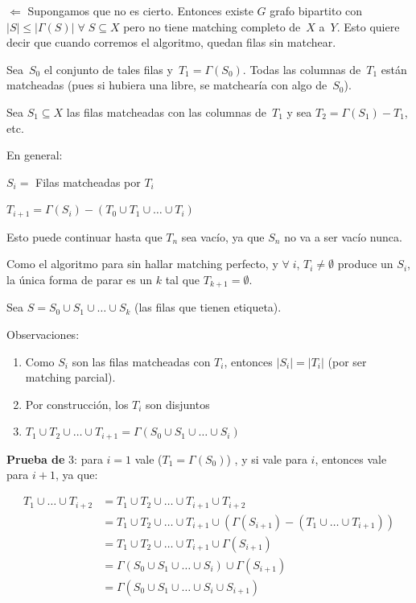 \documentclass[10pt,a4paper]{article}
\begin{document}
$\Leftarrow$ Supongamos que no es cierto. Entonces existe $G$ grafo bipartito con $\lvert S \rvert \leq \lvert \Gamma(S)\rvert\;\forall\;S \subseteq X$ pero no tiene matching completo de $X$ a $Y$. Esto quiere decir que cuando corremos el algoritmo, quedan filas sin matchear.

Sea $S_0$ el conjunto de tales filas y $T_1 = \Gamma(S_0)$. Todas las columnas de $T_1$ están matcheadas (pues si hubiera una libre, se matchearía con algo de $S_0$).

Sea $S_1 \subseteq X$ las filas matcheadas con las columnas de $T_1$ y sea $T_2 = \Gamma(S_1) - T_1$, etc.

En general:

\begin{center}
$S_i = $ Filas matcheadas por $T_i$
\end{center}

\begin{center}
$T_{i+1} = \Gamma(S_i) - (T_0 \cup T_1 \cup \dots \cup T_i)$
\end{center}

Esto puede continuar hasta que $T_n$ sea vacío, ya que $S_n$ no va a ser vacío nunca.

Como el algoritmo para sin hallar matching perfecto, y $\forall\;i$, $T_i \neq \emptyset$ produce un $S_i$, la única forma de parar es un $k$ tal que $T_{k+1} = \emptyset$.

Sea $S = S_0 \cup S_1 \cup \dots \cup S_k$ (las filas que tienen etiqueta).

Observaciones:

\begin{enumerate}

	\item Como $S_i$ son las filas matcheadas con $T_i$, entonces $\lvert S_i \rvert = \lvert T_i\rvert$ (por ser matching parcial).
	\item Por construcción, los $T_i$ son disjuntos
	\item $T_1 \cup T_2 \cup \dots \cup T_{i+1}= \Gamma(S_0 \cup S_1 \cup \dots \cup S_i)$
\end{enumerate}

\textbf{Prueba de }3: para $i = 1$ vale ($T_1 = \Gamma(S_0)$) , y si vale para $i$, entonces vale para $i + 1$, ya que:

\begin{center}
\begin{align*} T_1 \cup \dots \cup T_{i+2} &= T_1 \cup T_2 \cup \dots \cup T_{i+1} \cup T_{i+2}\\ &= T_1 \cup T_2 \cup \dots \cup T_{i+1} \cup(\Gamma(S_{i+1}) -( T_ 1 \cup \dots \cup T_{i+1}))\\ &= T_1 \cup T_2 \cup \dots \cup T_{i+1} \cup \Gamma(S_{i+1})\\ &= \Gamma(S_0 \cup S_1 \cup \dots \cup S_i) \cup \Gamma(S_{i+1})\\ &= \Gamma(S_0 \cup S_1 \cup \dots \cup S_i \cup S_{i+1})\\ \end{align*}
\end{center}
\end{document}

